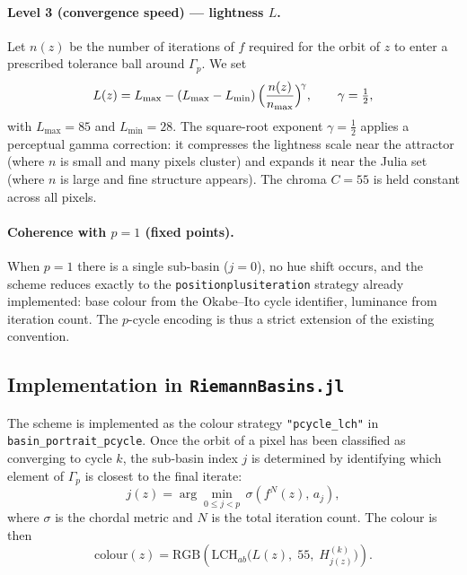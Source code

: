 \documentclass[12pt]{article}
\theoremstyle{definition}
\begin{document}
\paragraph{Level 3 (convergence speed) --- lightness $L$.}
Let $n(z)$ be the number of iterations of $f$ required for the orbit of $z$ to
enter a prescribed tolerance ball around $\Gamma_p$.  We set
\begin{equation}\label{eq:lightness}
  L(z) = L_{\max} - (L_{\max}-L_{\min})\,
           \Bigl(\frac{n(z)}{n_{\max}}\Bigr)^{\!\gamma},
  \qquad \gamma = \tfrac{1}{2},
\end{equation}
with $L_{\max}=85$ and $L_{\min}=28$.  The square-root exponent
$\gamma=\frac{1}{2}$ applies a perceptual gamma correction: it compresses the
lightness scale near the attractor (where $n$ is small and many pixels cluster)
and expands it near the Julia set (where $n$ is large and fine structure
appears).  The chroma $C=55$ is held constant across all pixels.

\paragraph{Coherence with $p=1$ (fixed points).}
When $p=1$ there is a single sub-basin ($j=0$), no hue shift occurs, and the
scheme reduces exactly to the \texttt{positionplusiteration} strategy already
implemented: base colour from the Okabe--Ito cycle identifier, luminance from
iteration count.  The $p$-cycle encoding is thus a strict extension of the
existing convention.

\subsection{Implementation in \texttt{RiemannBasins.jl}}

The scheme is implemented as the colour strategy
\texttt{"pcycle\_lch"} in \texttt{basin\_portrait\_pcycle}.
Once the orbit of a pixel has been classified as converging to cycle $k$,
the sub-basin index $j$ is determined by identifying which element of
$\Gamma_p$ is closest to the final iterate:
\[
  j(z) = \arg\min_{0\le j<p}\,
          \sigma\!\left(f^{N}(z),\,a_j\right),
\]
where $\sigma$ is the chordal metric and $N$ is the total iteration count.
The colour is then
\begin{equation}\label{eq:pcycle-colour}
  \mathrm{colour}(z)
    = \mathrm{RGB}\!\left(
        \mathrm{LCH}_{ab}\bigl(L(z),\;55,\;H^{(k)}_{j(z)}\bigr)
      \right).
\end{equation}
\end{document}
